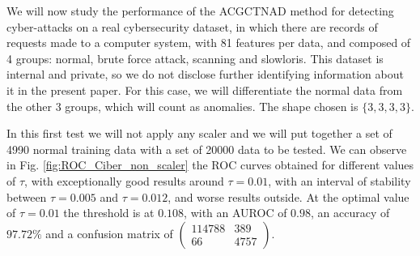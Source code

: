 \documentclass{article}
\begin{document}
We will now study the performance of the ACGCTNAD method for detecting cyber-attacks on a real cybersecurity dataset, in which there are records of requests made to a computer system, with 81 features per data, and composed of 4 groups: normal, brute force attack, scanning and slowloris. This dataset is internal and private, so we do not disclose further identifying information about it in the present paper. For this case, we will differentiate the normal data from the other 3 groups, which will count as anomalies. The shape chosen is $\{3,3,3,3\}$.

In this first test we will not apply any scaler and we will put together a set of 4990 normal training data with a set of 20000 data to be tested. We can observe in Fig. \ref{fig:ROC_Ciber_non_scaler} the ROC curves obtained for different values of $\tau$, with exceptionally good results around $\tau=0.01$, with an interval of stability between $\tau=0.005$ and $\tau=0.012$, and worse results outside. At the optimal value of $\tau=0.01$ the threshold is at $0.108$, with an AUROC of $0.98$, an accuracy of $97.72\%$ and a confusion matrix of
$\begin{pmatrix}
114788  & 389\\
66 & 4757
\end{pmatrix}$.
\end{document}
